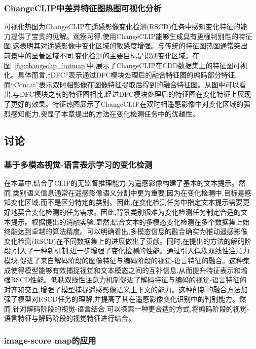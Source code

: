 \subsubsection{ChangeCLIP中差异特征图热图可视化分析}

可视化热图为ChangeCLIP在遥感影像变化检测(RSCD)任务中感知变化特征的能力提供了宝贵的见解。观察可得,使用ChangeCLIP能够生成具有更强判别性的特征图,这表明其对遥感影像中变化区域的敏感度增强。与传统的特征图热图通常突出前景中的显著区域不同,变化检测的主要目标是识别变化区域。在图~\ref{fig:changeclip_hotmap}中,展示了ChangeCLIP在CDD数据集上的特征图可视化。具体而言,``DFC''表示通过DFC模块处理后的融合特征图的编码部分特征,而``Concat''表示双时相影像在图像特征提取后得到的融合特征图。从图中可以看出,与DFC模块之前的特征图相比,经过DFC模块处理后的特征图在变化特征上展现了更好的效果。特征热图展示了ChangeCLIP在双时相遥感影像中对变化区域的强烈感知能力,突显了本章提出的方法在变化检测任务中的优越性。

\subsection{讨论}

\subsubsection{基于多模态视觉-语言表示学习的变化检测}

在本章中,结合了CLIP的无监督推理能力,为遥感影像构建了基本的文本提示。然而,类别语义信息通常在遥感影像语义分割中更为重要,因为在变化检测中,目标是感知变化区域,而不是区分特定的类别。因此,在变化检测任务中指定文本提示需要更好地契合变化检测的任务需求。因此,背景类别很难为变化检测任务制定合适的文本提示。根据提出的消融实验,显然,结合文本的多模态变化检测在多个数据集上始终能达到卓越的算法精度。可以明确看出,多模态信息的融合确实为推动遥感影像变化检测(RSCD)在不同数据集上的进展做出了贡献。同时,在提出的方法的解码阶段,引入了一种新机制,进一步增强了变化检测的性能。通过引入低秩双线性注意力模块,促进了来自解码阶段的图像特征与编码阶段的视觉-语言特征的融合。这种集成使得模型能够有效捕捉视觉和文本模态之间的互补信息,从而提升特征表示和增强RSCD性能。低秩双线性注意力机制促进了解码特征与编码的视觉-语言特征的对齐和交互,增强了模型捕捉遥感影像语义上下文的能力。这种创新的融合方法加强了模型对RSCD任务的理解,并提高了其在遥感影像变化识别中的判别能力。然而,针对解码阶段的视觉-语言结合,可以探索一种更合适的方式,将编码阶段的视觉-语言特征与解码阶段的视觉特征进行结合。

\subsubsection{image-score map的应用}

